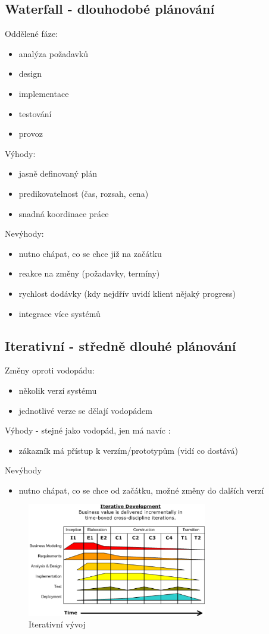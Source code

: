 \documentclass{szzclass}
\begin{document}
\subsection{Waterfall - dlouhodobé plánování}
Oddělené fáze:
\begin{itemize}
    \item analýza požadavků
    \item design
    \item implementace
    \item testování
    \item provoz
\end{itemize}
Výhody:
\begin{itemize}
    \item jasně definovaný plán
    \item predikovatelnost (čas, rozsah, cena)
    \item snadná koordinace práce
\end{itemize}
Nevýhody:
\begin{itemize}
    \item nutno chápat, co se chce již na začátku
    \item reakce na změny (požadavky, termíny)
    \item rychlost dodávky (kdy nejdřív uvidí klient nějaký progress)
    \item integrace více systémů
\end{itemize}
\subsection{Iterativní - středně dlouhé plánování}
Změny oproti vodopádu:
\begin{itemize}
    \item několik verzí systému
    \item jednotlivé verze se dělají vodopádem
\end{itemize}
Výhody - stejné jako vodopád, jen má navíc :
\begin{itemize}
    \item zákazník má přístup k verzím/prototypům (vidí co dostává)
\end{itemize}
Nevýhody
\begin{itemize}
    \item nutno chápat, co se chce od začátku, možné změny do dalších verzí
\end{itemize}
\begin{figure}[h!]
    \centering
    \includegraphics[width=0.7\textwidth]{topics/bi-wsi-si-24/images/iterativeDevelopment.png}
    \caption{Iterativní vývoj}
\end{figure}
\end{document}
